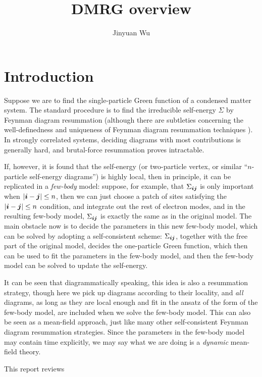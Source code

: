 \documentclass[hyperref, a4paper]{article}
\title{DMRG overview}
\author{Jinyuan Wu}
\begin{document}
    
\maketitle

\section{Introduction}

Suppose we are to find the single-particle Green function 
of a condensed matter system.
The standard procedure is to find the irreducible self-energy $\Sigma$
by Feynman diagram resummation
(although there are subtleties 
concerning the well-definedness and uniqueness of Feynman diagram resummation techniques 
\cite{PhysRevLett.119.056402}).
In strongly correlated systems,
deciding diagrams with most contributions is generally hard,
and brutal-force resummation proves intractable.

If, however, it is found that the self-energy 
(or two-particle vertex, or similar ``$n$-particle self-energy diagrams'')
is highly local, 
then in principle,
it can be replicated in a \emph{few-body} model:
suppose, for example, that $\Sigma_{\vb*{i} \vb*{j}}$ is only important 
when $\abs{\vb*{i} - \vb*{j}} \leq n$,
then we can just choose a patch of sites satisfying the $\abs{\vb*{i} - \vb*{j}} \leq n$ condition,
and integrate out the rest of electron modes,
and in the resulting few-body model,
$\Sigma_{\vb*{i} \vb*{j}}$ is exactly the same as in the original model.
The main obstacle now is to decide the parameters in this new few-body model,
which can be solved by adopting a self-consistent scheme:
$\Sigma_{\vb*{i} \vb*{j}}$, together with the free part of the original model,
decides the one-particle Green function,
which then can be used to fit the parameters in the few-body model,
and then the few-body model can be solved to update the self-energy.

It can be seen that diagrammatically speaking, 
this idea is also a resummation strategy,
though here we pick up diagrams according to their locality,
and \emph{all} diagrams, as long as they are local enough
and fit in the ansatz of the form of the few-body model,
are included when we solve the few-body model.
This can also be seen as a mean-field approach,
just like many other self-consistent Feynman diagram resummation strategies.
Since the parameters in the few-body model may contain time explicitly,
we may say what we are doing is a \emph{dynamic} mean-field theory.

This report reviews 
\end{document}
